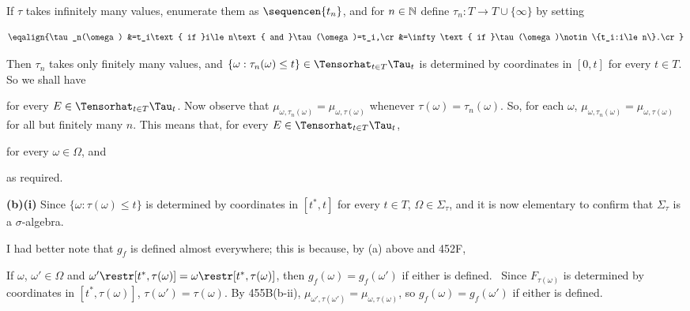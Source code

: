 {\medskip

 If $\tau$ takes infinitely many values, enumerate them as
$\sequencen{t_n}$, and for $n\in\Bbb N$ define
$\tau_n:T\to T\cup\{\infty\}$ by setting

$$\eqalign{\tau_n(\omega)
&=t_i\text{ if }i\le n\text{ and }\tau(\omega)=t_i,\cr
&=\infty\text{ if }\tau(\omega)\notin\{t_i:i\le n\}.\cr}$$

\noindent Then $\tau_n$ takes only finitely many values, and
$\{\omega:\tau_n(\omega)\le t\}\in\Tensorhat_{t\in T}\Tau_t$
is determined by coordinates in $[0,t]$ for every $t\in T$.
So we shall have


\noindent for every $E\in\Tensorhat_{t\in T}\Tau_t$.   Now observe that
$\mu_{\omega,\tau_n(\omega)}=\mu_{\omega,\tau(\omega)}$ whenever
$\tau(\omega)=\tau_n(\omega)$.
So, for each $\omega$,
$\mu_{\omega,\tau_n(\omega)}=\mu_{\omega,\tau(\omega)}$ for all but
finitely many $n$.   This means that, for every
$E\in\Tensorhat_{t\in T}\Tau_t$,


\noindent for every $\omega\in\Omega$, and


\noindent as required.

\medskip

{\bf (b)(i)} Since $\{\omega:\tau(\omega)\le t\}$ is determined by
coordinates in $[t^*,t]$ for every $t\in T$, $\Omega\in\Sigma_{\tau}$, and it
is now elementary to confirm that $\Sigma_{\tau}$ is a $\sigma$-algebra.

\medskip

 I had better note that $g_f$ is defined almost everywhere;
this is because, by (a) above and 452F,


\medskip

 If $\omega$, $\omega'\in\Omega$ and
$\omega'\restr[t^*,\tau(\omega)]=\omega\restr[t^*,\tau(\omega)]$, then
$g_f(\omega)=g_f(\omega')$ if either is defined.   \Prf\ Since
$F_{\tau(\omega)}$ is determined by coordinates in $[t^*,\tau(\omega)]$,
$\tau(\omega')=\tau(\omega)$.   By 455B(b-ii),
$\mu_{\omega',\tau(\omega')}=\mu_{\omega,\tau(\omega)}$, so
$g_f(\omega)=g_f(\omega')$ if either is defined.\ \Qed

}
